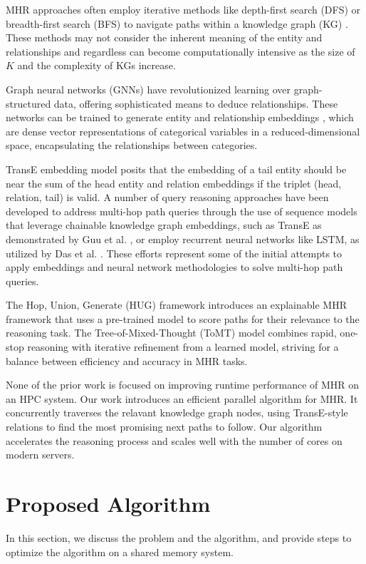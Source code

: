 \documentclass[sigconf]{acmart}
\begin{document}
MHR approaches often employ iterative methods like depth-first search (DFS) or breadth-first search (BFS) to navigate paths within a knowledge graph (KG) \cite{lao2010relational}. These methods may not consider the inherent meaning of the entity and relationships and regardless can become computationally intensive as the size of $K$ and the complexity of KGs increase.

Graph neural networks (GNNs) \cite{gilmer2020message,khemani2024review} have revolutionized learning over graph-structured data, offering sophisticated means to deduce relationships. These networks can be trained to generate entity and relationship embeddings \cite{guo2016entity}, which are dense vector representations of categorical variables in a reduced-dimensional space, encapsulating the relationships between categories.

TransE \cite{bordes2013translating} embedding model posits that the embedding of a tail entity should be near the sum of the head entity and relation embeddings if the triplet (head, relation, tail) is valid. A number of query reasoning approaches have been developed to address multi-hop path queries through the use of sequence models that leverage chainable knowledge graph embeddings, such as TransE as demonstrated by Guu et al. \cite{guu2015traversing}, or employ recurrent neural networks like LSTM, as utilized by Das et al. \cite{das2016chains}. These efforts represent some of the initial attempts to apply embeddings and neural network methodologies to solve multi-hop path queries.
 
The Hop, Union, Generate (HUG) \cite{zhao-etal-2023-hop} framework introduces an explainable MHR framework that uses a pre-trained model to score paths for their relevance to the reasoning task. The Tree-of-Mixed-Thought (ToMT) \cite{hu2023treeofmixedthought} model combines rapid, one-stop reasoning with iterative refinement from a learned model, striving for a balance between efficiency and accuracy in MHR tasks.

None of the prior work is focused on improving runtime performance of MHR on an HPC system. Our work introduces an efficient parallel algorithm for MHR. It concurrently traverses the relavant knowledge graph nodes, using TransE-style relations to find the most promising next paths to follow. Our algorithm accelerates the reasoning process and scales well with the number of cores on modern servers.

\section{Proposed Algorithm}
In this section, we discuss the problem and the algorithm, and provide steps to optimize the algorithm on a shared memory system. 
\end{document}
